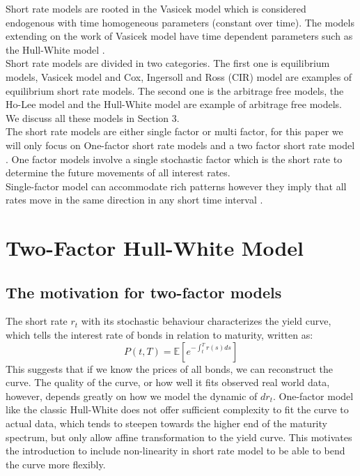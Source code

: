 \documentclass[11pt]{article}
\begin{document}
Short rate models are rooted in the Vasicek model \cite{BN1} which is considered endogenous with time homogeneous parameters (constant over time).  The models extending on the work of Vasicek model have time dependent parameters such as the Hull-White model \cite{HW1}. \\

Short rate models are divided in two categories.  The first one is equilibrium models, Vasicek model and Cox, Ingersoll and Ross (CIR) model are examples of equilibrium short rate models.  The second one is the arbitrage free models, the Ho-Lee model and the Hull-White model are example of arbitrage free models.  We discuss all these models in Section 3. \\ 

The short rate models are either single factor or multi factor, for this paper we will only focus on One-factor short rate models and a two factor short rate model \cite{BA1}.  One factor  models involve a single stochastic factor which is the short rate to determine the future movements of all interest rates.  \\

Single-factor model can accommodate rich patterns however they imply that all rates move in the same direction in any short time interval \cite{cheng2006hull}.


\section{Two-Factor Hull-White Model 
}
\subsection{The motivation for two-factor models
}
The short rate $r_t$ with its stochastic behaviour characterizes the yield curve, which tells the interest rate of bonds in relation to maturity, written as:
\[
P(t,T) = \mathbb{E}\left[e^{-\int_{t}^{T}r(s)ds}\right]
\]
This suggests that if we know the prices of all bonds, we can reconstruct the curve. The quality of the curve, or how well it fits observed real world data, however, depends greatly on how we model the dynamic of $dr_t$. One-factor model like the classic Hull-White does not offer sufficient complexity to fit the curve to actual data, which tends to steepen towards the higher end of the maturity spectrum, but only allow affine transformation to the yield curve. This motivates the introduction to include non-linearity in short rate model to be able to bend the curve more flexibly.
\end{document}
